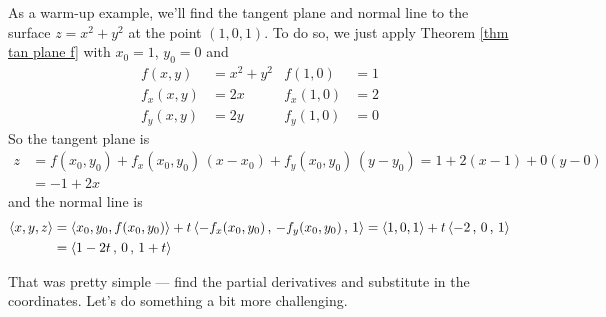 \begin{eg}\label{eg tan plane A}
As a warm-up example, we'll find the tangent plane and normal line
to the surface $z=x^2+y^2$ at the point $(1,0,1)$. To do so, we just apply
Theorem \ref{thm tan plane f} with $x_0=1$, $y_0=0$ and
\begin{align*}
f(x,y)&= x^2+y^2 &  f(1,0)&=1 \\
f_x(x,y)&=2x &  f_x(1,0)&=2 \\
f_y(x,y)&=2y &  f_y(1,0)&=0
\end{align*}
So the tangent plane is
\begin{align*}
z&=f(x_0,y_0) + f_x(x_0,y_0)\,(x-x_0) + f_y(x_0,y_0)\,(y-y_0)
 = 1 +2(x-1) +0(y-0) \\
 &= -1+2x
\end{align*}
and the normal line is
\begin{align*}
\left< x,y,z \right> &=  \left< x_0,y_0,f(x_0,y_0) \right>
                 +t\left< -f_x(x_0,y_0)\,,\, - f_y(x_0,y_0)\,,\, 1 \right> 
=  \left< 1,0,1 \right>
                 +t\left< -2\,,\, 0\,,\, 1 \right> \\
&=  \left< 1-2t\,,\,0\,,\,1+t \right>
\end{align*}
\end{eg}
That was pretty simple --- find the partial derivatives and substitute
in the coordinates. Let's do something a bit more challenging.

